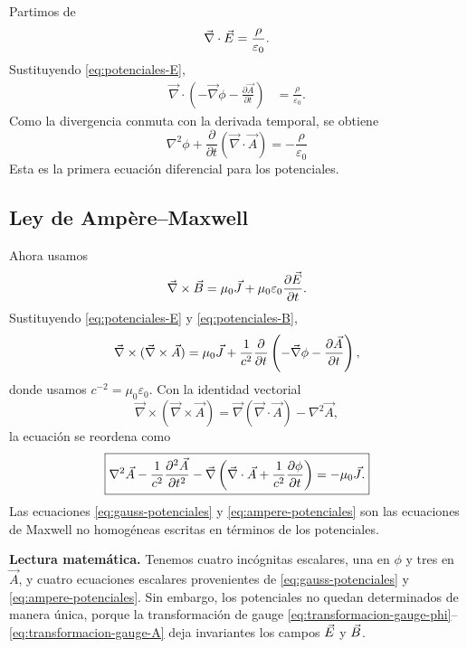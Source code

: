 \documentclass[../main.tex]{subfiles}
\begin{document}
Partimos de
\begin{equation*}
    \vec\nabla\cdot\vec{E}=\frac{\rho}{\varepsilon_0}.
\end{equation*}
Sustituyendo \eqref{eq:potenciales-E},
\begin{align}
    \vec\nabla\cdot\left(-\vec\nabla\phi-\frac{\partial\vec A}{\partial t}\right)
    &=\frac{\rho}{\varepsilon_0}.
\end{align}
Como la divergencia conmuta con la derivada temporal, se obtiene
\begin{equation}
    \boxed{
    \nabla^2\phi+\frac{\partial}{\partial t}\left(\vec\nabla\cdot\vec A\right)
    =-\frac{\rho}{\varepsilon_0}}
    \label{eq:gauss-potenciales}
\end{equation}
Esta es la primera ecuación diferencial para los potenciales.

\subsection*{Ley de Ampère--Maxwell}

Ahora usamos
\begin{equation*}
    \vec\nabla\times\vec{B}=\mu_0\vec{J}+\mu_0\varepsilon_0\frac{\partial\vec{E}}{\partial t}.
\end{equation*}
Sustituyendo \eqref{eq:potenciales-E} y \eqref{eq:potenciales-B},
\begin{equation}
    \vec\nabla\times(\vec\nabla\times\vec A)
    =\mu_0\vec{J}+\frac{1}{c^2}\frac{\partial}{\partial t}
    \left(-\vec\nabla\phi-\frac{\partial\vec A}{\partial t}\right),
    \label{eq:ampere-potenciales-inicio}
\end{equation}
donde usamos $c^{-2}=\mu_0\varepsilon_0$. Con la identidad vectorial
\begin{equation*}
    \vec\nabla\times(\vec\nabla\times\vec A)
    =\vec\nabla(\vec\nabla\cdot\vec A)-\nabla^2\vec A,
\end{equation*}
la ecuación se reordena como
\begin{equation}
    \boxed{
    \nabla^2\vec A-\frac{1}{c^2}\frac{\partial^2\vec A}{\partial t^2}
    -\vec\nabla\left(\vec\nabla\cdot\vec A+\frac{1}{c^2}\frac{\partial\phi}{\partial t}\right)
    =-\mu_0\vec{J}.}
    \label{eq:ampere-potenciales}
\end{equation}
Las ecuaciones \eqref{eq:gauss-potenciales} y \eqref{eq:ampere-potenciales} son las ecuaciones de Maxwell no homogéneas escritas en términos de los potenciales.

\begin{cajaidea}
\textbf{Lectura matemática.} Tenemos cuatro incógnitas escalares, una en $\phi$ y tres en $\vec A$, y cuatro ecuaciones escalares provenientes de \eqref{eq:gauss-potenciales} y \eqref{eq:ampere-potenciales}. Sin embargo, los potenciales no quedan determinados de manera única, porque la transformación de gauge \eqref{eq:transformacion-gauge-phi}--\eqref{eq:transformacion-gauge-A} deja invariantes los campos $\vec{E}$ y $\vec{B}$.
\end{cajaidea}
\end{document}
